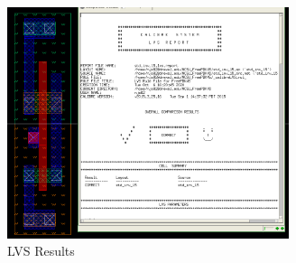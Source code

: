 \documentclass[12pt]{article}
\begin{document}
\begin{figure}[!htb]
  \centering
  \includegraphics[width=3.25in]{figures/lvs.png}
  \caption{LVS Results}\label{fig:lvs}
\end{figure}
\end{document}
